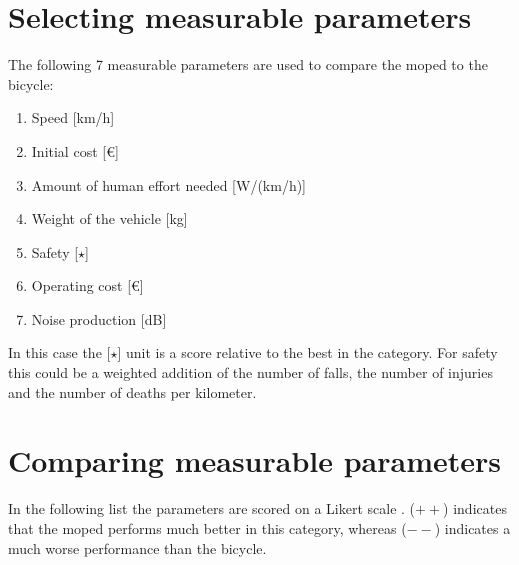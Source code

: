 \documentclass[a4paper]{article}
\begin{document}
\section{Selecting measurable parameters}
\label{sec:selecting}

The following 7 measurable parameters are used to compare the moped to the bicycle:
\begin{enumerate}
\item Speed [km/h]
\item Initial cost [€]
\item Amount of human effort needed [W/(km/h)]
\item Weight of the vehicle [kg]
\item Safety [$\star$]
\item Operating cost [€]
\item Noise production [dB]
\end{enumerate}

In this case the [$\star$] unit is a score relative to the best in the category.
For safety this could be a weighted addition of the number of falls, the number of injuries and the number of deaths per kilometer.

\section{Comparing measurable parameters}
\label{sec:comparing}

In the following list the parameters are scored on a Likert scale \cite{likert}. ($++$) indicates that the moped performs much better in this category, whereas ($--$) indicates a much worse performance than the bicycle.
\end{document}
